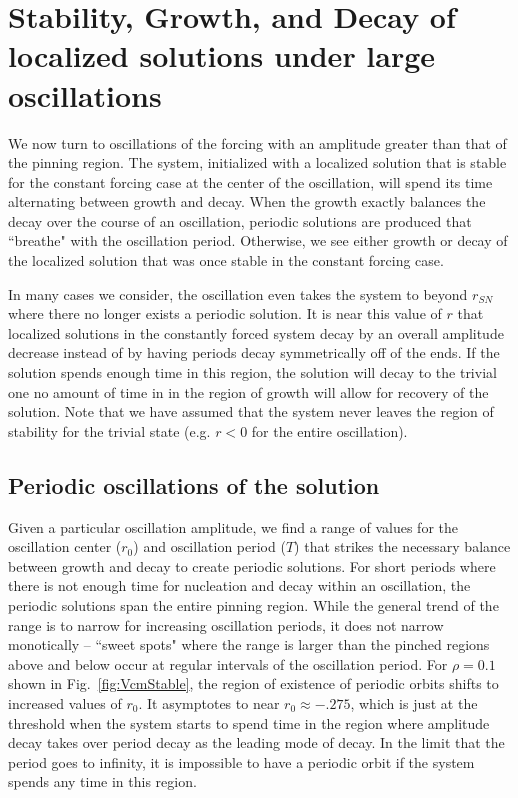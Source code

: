 \documentclass[../main/TimeForcingSHE.tex]{subfiles}
\begin{document}
\section{Stability, Growth, and Decay of localized solutions under large oscillations }

We now turn to oscillations of the forcing with an amplitude greater than that of the pinning region.   The system,  initialized with a localized solution that is stable for the constant forcing case at the center of the oscillation, will spend its time alternating between growth and decay.    When the growth exactly balances the decay over the course of an oscillation, periodic solutions are produced that ``breathe" with the oscillation period. Otherwise, we see either growth or decay of the localized solution that was once stable in the constant forcing case. 

 In many cases we consider, the oscillation even takes the system to beyond $r_{SN}$ where there no longer exists a periodic solution.  It is near this value of $r$ that localized solutions in the constantly forced system decay by an overall amplitude decrease instead of by having periods decay symmetrically off of the ends.  If the solution spends enough time in this region, the solution will decay to the trivial one no amount of time in in the region of growth will allow for recovery of the solution.  Note that we have assumed that the system never leaves the region of stability for the trivial state (e.g. $r<0$ for the entire oscillation).



\subsection{Periodic oscillations of the solution}
Given a particular oscillation amplitude, we find a range of values for the oscillation center ($r_0$) and oscillation period ($T$) that strikes the necessary balance between growth and decay to create periodic solutions.  For short periods where there is not enough time for nucleation and decay within an oscillation, the periodic solutions span the entire pinning region.   While the general trend of the range is to narrow for increasing oscillation periods, it does not narrow monotically -- ``sweet spots" where the range is larger than the pinched regions above and below occur at regular intervals of the oscillation period.  For $\rho=0.1$ shown in Fig.~\ref{fig:VcmStable}, the region of existence of periodic orbits shifts to increased values of $r_0$.  It asymptotes to near $r_0\approx -.275$, which is just at the threshold when the system starts to spend time in the region where amplitude decay takes over period decay as the leading mode of decay.    In the limit that the period goes to infinity, it is impossible to have a periodic orbit if the system spends any time in this region. 
\FIGvcmstable
\end{document}
